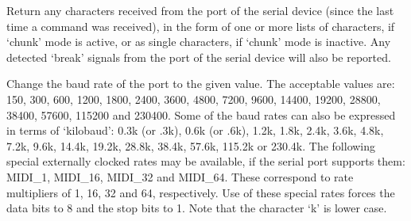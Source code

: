   \objListArgEnd

\objItemInlet{\ }

  \objListIOBegin
  \objListIOEnd

\objItemOutlet{\ }

  \objListIOBegin



  \objListIOEnd






\objItemCommands[]

  \objListCmdBegin

  Return any characters received from the port of the serial device (since the last time a
   command was received), in the form of one or more lists of characters, if
  `chunk' mode is active, or as single characters, if `chunk' mode is inactive.
  Any detected `break' signals from the port of the serial device will also be reported.

  Change the baud rate of the port to the given value.
  The acceptable values are: 150, 300, 600, 1200, 1800, 2400, 3600, 4800, 7200, 9600, 14400,
  19200, 28800, 38400, 57600, 115200 and 230400.
  Some of the baud rates can also be expressed in terms of `kilobaud': 0.3k (or .3k), 0.6k
  (or .6k), 1.2k, 1.8k, 2.4k, 3.6k, 4.8k, 7.2k, 9.6k, 14.4k, 19.2k, 28.8k, 38.4k, 57.6k,
  115.2k or 230.4k.
  The following special externally clocked rates may be available, if the serial port supports them:
  MIDI\_1, MIDI\_16, MIDI\_32 and MIDI\_64.
  These correspond to rate multipliers of 1, 16, 32 and 64, respectively.
  Use of these special rates forces the data bits to 8 and the stop bits to 1.
  Note that the character `k' is lower case.

